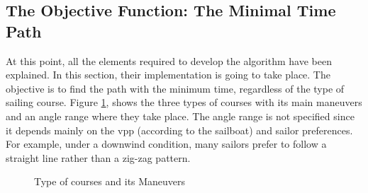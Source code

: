 \subsection{The Objective Function: The Minimal Time Path}
At this point, all the elements required to develop the algorithm have been explained. In this section, their implementation is going to take place. The objective is to find the path with the minimum time, regardless of the type of sailing course. Figure \ref{fig:SailModes_Man}, shows the three types of courses with its main maneuvers and an angle range where they take place. The angle range is not specified since it depends mainly on the \acrshort{vpp} (according to the sailboat) and sailor preferences. For example, under a downwind condition, many sailors prefer to follow a straight line rather than a zig-zag pattern.  \par
\begin{figure} [hbt!]
  \centering
  \hfill 
  \caption{Type of courses and its Maneuvers \cite{Alves2014ASailboat}}
\label{fig:SailModes_Man} 
\end{figure}

